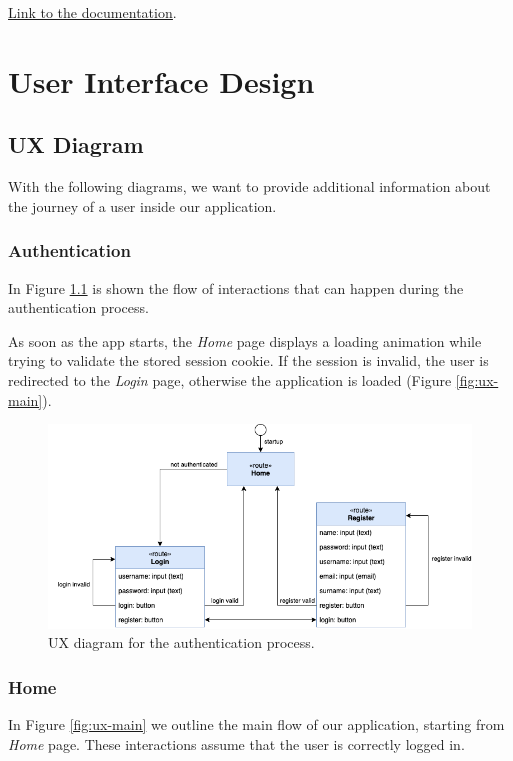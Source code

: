\underline{\href{https://comuni-ita.herokuapp.com}{Link to the documentation}}.



\chapter{User Interface Design}

\section{UX Diagram}
With the following diagrams, we want to provide additional information about the journey of a user inside our application.

\subsection{Authentication}
In Figure \ref{fig:ux-auth} is shown the flow of interactions that can happen during the authentication process.

As soon as the app starts, the \textit{Home} page displays a loading animation while trying to validate the stored session cookie.
If the session is invalid, the user is redirected to the \textit{Login} page, otherwise the application is loaded (Figure \ref{fig:ux-main}).

\begin{figure}[H]
      \includegraphics{ux-diagram/ux-auth.png}
      \caption{UX diagram for the authentication process.}
      \label{fig:ux-auth}
\end{figure}

\subsection{Home}
In Figure \ref{fig:ux-main} we outline the main flow of our application, starting from \textit{Home} page.
These interactions assume that the user is correctly logged in.


